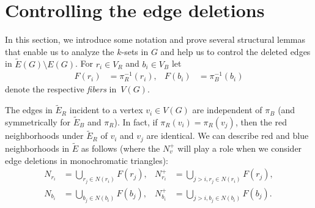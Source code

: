 \documentclass{article}
\begin{document}
\section{Controlling the edge deletions} \label{sec:prelim}

In this section, we introduce some notation and prove several structural lemmas that enable us to analyze the $k$-sets in $G$ and help us to control the deleted edges in $\tilde{E}(G)\setminus E(G)$. For $r_i \in V_R$ and $b_i \in V_B$ let
\begin{align*}
    F(r_i) &= \pi_R^{-1}(r_i),
    &F(b_i) &= \pi_B^{-1}(b_i)
\end{align*}   
denote the respective {\em fibers} in~$V(G)$. 

The edges in $\tilde{E}_R$ incident to a vertex $v_i\in V(G)$ are independent of $\pi_B$ (and symmetrically for $\tilde{E}_B$ and $\pi_R$). In fact, if $\pi_R(v_i)=\pi_R(v_j)$, then the red neighborhoods under $\tilde{E}_R$ of $v_i$ and $v_j$ are identical. We can describe red and blue neighborhoods in $\tilde{E}$ as follows (where the $N_v^+$ will play a role when we consider edge deletions in monochromatic triangles):
\begin{align*}
    N_{r_i}&=\bigcup_{r_j\in N(r_i)}F(r_j),
    &N_{r_i}^+&=\bigcup_{j>i,r_j\in N(r_i)}F(r_j),\\
    N_{b_i}&=\bigcup_{b_j\in N(b_i)}F(b_j),
    &N_{b_i}^+&=\bigcup_{j>i,b_j\in N(b_i)}F(b_j).
\end{align*}
\end{document}

